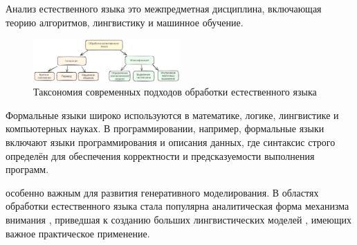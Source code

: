 Анализ естественного языка это межпредметная дисциплина, включающая теорию алгоритмов, 
лингвистику и машинное обучение.

\begin{figure}[h]
    \centering
    \includegraphics[width=0.5\textwidth]{assets/ml/nlp/taxonomy.excalidraw.png}
    \caption{Таксономия современных подходов обработки естественного языка}
    \label{llm_taxonomy}
\end{figure}

Формальные языки широко используются в математике, логике, лингвистике и компьютерных науках. 
В программировании, например, формальные языки включают языки программирования и описания данных, 
где синтаксис строго определён для обеспечения корректности и предсказуемости выполнения программ.

особенно важным для развития генеративного моделирования.
В областях обработки естественного языка стала популярна аналитическая форма механизма внимания \cite{vaswani2017attention},
приведшая к созданию больших лингвистических моделей \cite{radford2019language}, имеющих важное практическое применение.

